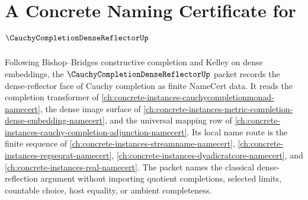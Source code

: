 \chapter{A Concrete Naming Certificate for $\CauchyCompletionDenseReflectorUp$}
\label{ch:concrete-instances-cauchy-completion-dense-reflector-namecert}

Following Bishop--Bridges constructive completion and Kelley on dense embeddings, the $\CauchyCompletionDenseReflectorUp$ packet records the dense-reflector face of Cauchy completion as finite NameCert data. It reads the completion transformer of \autoref{ch:concrete-instances-cauchycompletionmonad-namecert}, the dense image surface of \autoref{ch:concrete-instances-metric-completion-dense-embedding-namecert}, and the universal mapping row of \autoref{ch:concrete-instances-cauchy-completion-adjunction-namecert}. Its local name route is the finite sequence of \autoref{ch:concrete-instances-streamname-namecert}, \autoref{ch:concrete-instances-regseqrat-namecert}, \autoref{ch:concrete-instances-dyadicratcore-namecert}, and \autoref{ch:concrete-instances-real-namecert}. The packet names the classical dense-reflection argument without importing quotient completions, selected limits, countable choice, host equality, or ambient completeness.

